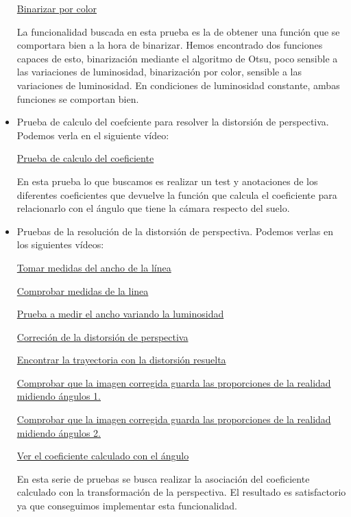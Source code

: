 \begin{itemize}
	\href{https://youtu.be/Rks5PkxDeZQ}{Binarizar por color}
	
	La funcionalidad buscada en esta prueba es la de obtener una función que se comportara bien a la hora de binarizar. Hemos encontrado dos funciones capaces de esto, binarización mediante el algoritmo de Otsu, poco sensible a las variaciones de luminosidad, binarización por color, sensible a las variaciones de luminosidad. En condiciones de luminosidad constante, ambas funciones se comportan bien.
	
	\item Prueba de calculo del coefciente para resolver la distorsión de perspectiva. Podemos verla en el siguiente vídeo: 
	
	\href{https://youtu.be/Y9QgFIMXSiU}{Prueba de calculo del coeficiente}
	
	En esta prueba lo que buscamos es realizar un test y anotaciones de los diferentes coeficientes que devuelve la función que calcula el coeficiente para relacionarlo con el ángulo que tiene la cámara respecto del suelo.	
	
	\item Pruebas de la resolución de la distorsión de perspectiva. Podemos verlas en los siguientes vídeos:
	
	\href{https://youtu.be/rUQrHbA_H8A}{Tomar medidas del ancho de la línea}
	
	\href{https://youtu.be/ClA-Ei8f18o}{Comprobar medidas de la linea}
	
	\href{https://youtu.be/m7t4dcfuFeo}{Prueba a medir el ancho variando la luminosidad}
	
	\href{https://youtu.be/Y9QgFIMXSiU}{Correción de la distorsión de perspectiva}
	
	\href{https://youtu.be/Ae5aTr3mg6k}{Encontrar la trayectoria con la distorsión resuelta}
	
	\href{https://youtu.be/wc00piNmfyI}{Comprobar que la imagen corregida guarda las proporciones de la realidad midiendo ángulos 1.}
	
	\href{https://youtu.be/T0djIwql6G8}{Comprobar que la imagen corregida guarda las proporciones de la realidad midiendo ángulos 2.}
	
	\href{https://youtu.be/pRE8zerfp7E}{Ver el coeficiente calculado con el ángulo}
	
	En esta serie de pruebas se busca realizar la asociación del coeficiente calculado con la transformación de la perspectiva. El resultado es satisfactorio ya que conseguimos implementar esta funcionalidad. 
	

\end{itemize}
